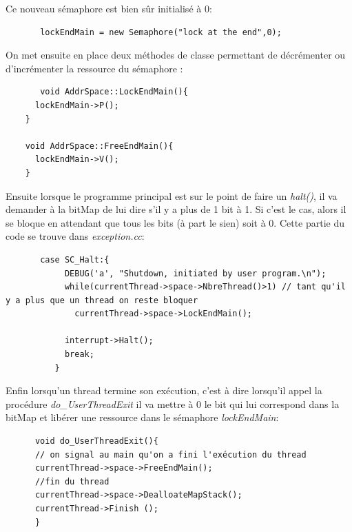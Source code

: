 \documentclass[a4paper,10pt]{article}
\begin{document}
      Ce nouveau sémaphore est bien sûr initialisé à 0:
      \begin{lstlisting}
       lockEndMain = new Semaphore("lock at the end",0);
      \end{lstlisting}
      \newpage
      On met ensuite en place deux méthodes de classe permettant de décrémenter ou d'incrémenter la ressource du sémaphore :
      \begin{lstlisting}
       void AddrSpace::LockEndMain(){
	  lockEndMain->P();
	}

	void AddrSpace::FreeEndMain(){
	  lockEndMain->V();
	}
      \end{lstlisting}
      
      Ensuite lorsque le programme principal est sur le point de faire un \emph{halt()}, il va demander à la bitMap de lui dire s'il y a plus de 1 bit à 1.
      Si c'est le cas, alors il se bloque en attendant que tous les bits (à part le sien) soit à 0. Cette partie du code se trouve dans \emph{exception.cc}:
      \begin{lstlisting}
       case SC_Halt:{
            DEBUG('a', "Shutdown, initiated by user program.\n");
            while(currentThread->space->NbreThread()>1) // tant qu'il y a plus que un thread on reste bloquer
              currentThread->space->LockEndMain();
            
            interrupt->Halt();
            break;
          }
      \end{lstlisting}

     Enfin lorsqu'un thread termine son exécution, c'est à dire lorsqu'il appel la procédure \emph{do\_UserThreadExit} il va mettre à 0 le bit qui lui
     correspond dans la bitMap et libérer une ressource dans le sémaphore \emph{lockEndMain}:
     
     \begin{lstlisting}
      void do_UserThreadExit(){	
	  // on signal au main qu'on a fini l'exécution du thread
	  currentThread->space->FreeEndMain();
	  //fin du thread
	  currentThread->space->DealloateMapStack();
	  currentThread->Finish ();
      }
     \end{lstlisting}
    
\end{document}
